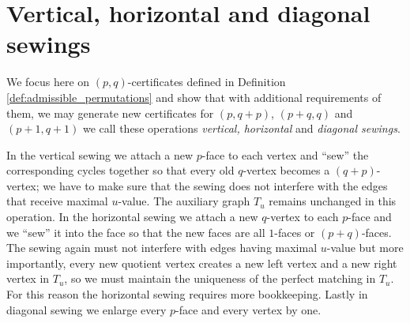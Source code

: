\documentclass[11pt]{article}
\theoremstyle{remark}
\newcommand{\elltwo}{\ell^2}
\newcommand{\ve}{\vec e}
\newcommand{\cev}[1]{\reflectbox{\ensuremath{\vec{\reflectbox{\ensuremath{#1}}}}}}
\begin{document}









\section{Vertical,  horizontal and diagonal sewings} \label{sec:sewing}

We focus here on $(p,q)$-certificates defined in Definition \ref{def:admissible_permutations} and show that with additional requirements of them, we may generate new certificates for $(p,q+p)$,  $(p+q,q)$ and $(p+1,q+1)$ we call these operations \emph{vertical, horizontal} and \emph{diagonal sewings}. 

In the vertical sewing we attach a new $p$-face to each vertex and ``sew'' the corresponding cycles together so that every old $q$-vertex becomes a $(q+p)$-vertex; we have to make sure that the sewing does not interfere with the edges that receive maximal $u$-value. The auxiliary graph $T_u$ remains unchanged in this operation. In the horizontal sewing we attach a new $q$-vertex to each $p$-face and we ``sew'' it into the face so that the new faces are all $1$-faces or $(p+q)$-faces. The sewing again must not interfere with edges having maximal $u$-value but more importantly, every new quotient vertex creates a new left vertex and a new right vertex in $T_u$, so we must maintain the uniqueness of the perfect matching in $T_u$. For this reason the horizontal sewing requires more bookkeeping. Lastly in diagonal sewing we enlarge every $p$-face and every vertex by one. 
\end{document}
